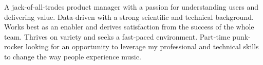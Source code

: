 

\begin{cvparagraph}


  A jack-of-all-trades product manager with a passion for understanding users and delivering value. Data-driven with a strong scientific and technical background. Works best as an enabler and derives satisfaction from the success of the whole team. Thrives on variety and seeks a fast-paced environment. Part-time punk-rocker looking for an opportunity to leverage my professional and technical skills to change the way people experience music.
\end{cvparagraph}
